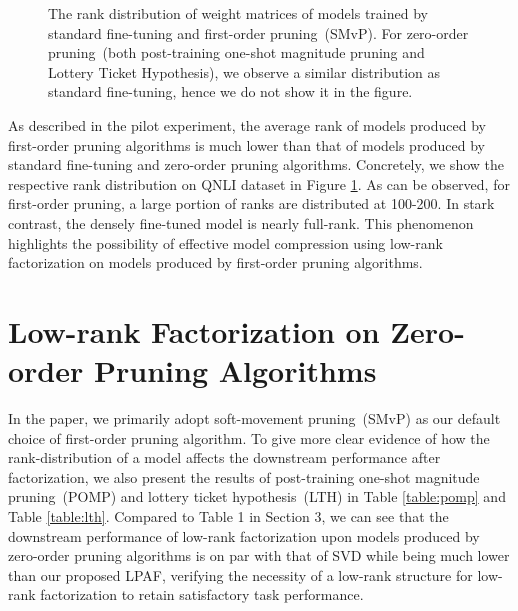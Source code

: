 \documentclass[letterpaper]{article} %
\newcommand{\figref}[1]{Figure \ref{#1}}
\newcommand{\tabref}[1]{Table \ref{#1}}
\begin{document}
	
	\begin{figure}[h]
		\centering
		\caption{The rank distribution of weight matrices of models trained by standard fine-tuning and first-order pruning~(SMvP). For zero-order pruning~(both post-training one-shot magnitude pruning and Lottery Ticket Hypothesis), we observe a similar distribution as standard fine-tuning, hence we do not show it in the figure.}
		\label{fig:rank}
	\end{figure}
	As described in the pilot experiment, the average rank of models produced by first-order pruning algorithms is much lower than that of models produced by standard fine-tuning and zero-order pruning algorithms. Concretely, we show the respective rank distribution on QNLI dataset in \figref{fig:rank}. As can be observed, for first-order pruning,  a large portion of ranks are distributed at 100-200. In stark contrast, the densely fine-tuned model is nearly full-rank. This phenomenon highlights the possibility of effective model compression using low-rank factorization on models produced by first-order pruning algorithms.
	
	
	
	
	\section{Low-rank Factorization on Zero-order Pruning Algorithms}
	\label{sec:appendixB}
	
	
	In the paper, we primarily adopt soft-movement pruning~(SMvP) as our default choice of first-order pruning algorithm. To give more clear evidence of how the rank-distribution of a model affects the downstream performance after factorization, we also present the results of post-training one-shot magnitude pruning~(POMP) and lottery ticket hypothesis~(LTH) in \tabref{table:pomp} and \tabref{table:lth}. Compared to Table 1 in Section 3, we can see that the downstream performance of low-rank factorization upon models produced by zero-order pruning algorithms is on par with that of SVD while being much lower than our proposed LPAF, verifying the necessity of a low-rank structure for low-rank factorization to retain satisfactory task performance.
	
\end{document}
